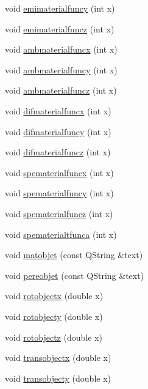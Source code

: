\begin{DoxyCompactItemize}
void \hyperlink{class_mondock_a1d7a5a172040878b370a2fa56de8774b}{emimaterialfuncy} (int x)
\item 
void \hyperlink{class_mondock_ab69c246125f45077904e519c7f0e397c}{emimaterialfuncz} (int x)
\item 
void \hyperlink{class_mondock_a8311bcb6b47314eba3966861c6cfe53a}{ambmaterialfuncx} (int x)
\item 
void \hyperlink{class_mondock_abab8b7116db8f4d8a45f97bbccfea28a}{ambmaterialfuncy} (int x)
\item 
void \hyperlink{class_mondock_aef75cf8b1bb4a9cf7e6f6a04ac9a6e53}{ambmaterialfuncz} (int x)
\item 
void \hyperlink{class_mondock_ab52fa4e602f9dd7686b4beaee1ae78a7}{difmaterialfuncx} (int x)
\item 
void \hyperlink{class_mondock_acb6ef6ce35644055c6782614193c0abf}{difmaterialfuncy} (int x)
\item 
void \hyperlink{class_mondock_a8ff74685d0e326198673395786ca80d4}{difmaterialfuncz} (int x)
\item 
void \hyperlink{class_mondock_ad62497d70cea045864c6f6dfa63f0a4c}{spematerialfuncx} (int x)
\item 
void \hyperlink{class_mondock_ada51acb02b3cb5d32e3982e93e2b2951}{spematerialfuncy} (int x)
\item 
void \hyperlink{class_mondock_aebe3927b8d0b1c6a703580cf69284405}{spematerialfuncz} (int x)
\item 
void \hyperlink{class_mondock_acfe377696276e313ee29188412cdefc5}{spematerialtfunca} (int x)
\item 
void \hyperlink{class_mondock_ae7cba6de97474c812bf5f6e1f5372540}{matobjet} (const Q\+String \&text)
\item 
void \hyperlink{class_mondock_afcb87fab11d89a1a24da091153d4dbac}{pereobjet} (const Q\+String \&text)
\item 
void \hyperlink{class_mondock_a7543dea413bcfc6c79847373e99f75fc}{rotobjectx} (double x)
\item 
void \hyperlink{class_mondock_ad182d69edf7f245ade47b574813357d0}{rotobjecty} (double x)
\item 
void \hyperlink{class_mondock_a90dd35e5da95e3b29a44104f8527605b}{rotobjectz} (double x)
\item 
void \hyperlink{class_mondock_a68ab5d84182366c7231014333055d12d}{transobjectx} (double x)
\item 
void \hyperlink{class_mondock_ac6fba22518497d0b8ed04c976dd98ef3}{transobjecty} (double x)
\item 

\end{DoxyCompactItemize}
